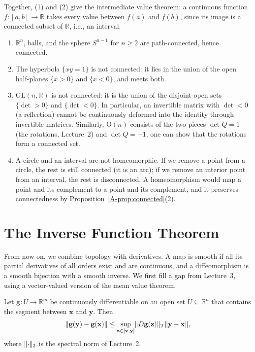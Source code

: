 Together, (1) and (2) give the intermediate value theorem: a continuous function $f: [a, b] \to \mathbb{R}$ takes every value between $f(a)$ and $f(b)$, since its image is a connected subset of $\mathbb{R}$, i.e., an interval.

\begin{example}\label{A-ex:connected}
    \begin{enumerate}
        \item $\mathbb{R}^n$, balls, and the sphere $S^{n-1}$ for $n \geq 2$ are path-connected, hence connected.
        \item The hyperbola $\{xy = 1\}$ is not connected: it lies in the union of the open half-planes $\{x > 0\}$ and $\{x < 0\}$, and meets both.
        \item $\mathrm{GL}(n, \mathbb{R})$ is not connected: it is the union of the disjoint open sets $\{\det > 0\}$ and $\{\det < 0\}$. In particular, an invertible matrix with $\det < 0$ (a reflection) cannot be continuously deformed into the identity through invertible matrices. Similarly, $\mathrm{O}(n)$ consists of the two pieces $\det Q = 1$ (the rotations, Lecture~2) and $\det Q = -1$; one can show that the rotations form a connected set.
        \item A circle and an interval are not homeomorphic. If we remove a point from a circle, the rest is still connected (it is an arc); if we remove an interior point from an interval, the rest is disconnected. A homeomorphism would map a point and its complement to a point and its complement, and it preserves connectedness by Proposition~\ref{A-prop:connected}(2).
    \end{enumerate}
\end{example}

\section{The Inverse Function Theorem}\label{A-sec:inverse}

From now on, we combine topology with derivatives. A map is smooth if all its partial derivatives of all orders exist and are continuous, and a diffeomorphism is a smooth bijection with a smooth inverse. We first fill a gap from Lecture~3, using a vector-valued version of the mean value theorem.

\begin{lemma}\label{A-lem:mean-value}
    Let $\mathbf{g}: U \to \mathbb{R}^m$ be continuously differentiable on an open set $U \subseteq \mathbb{R}^n$ that contains the segment between $\mathbf{x}$ and $\mathbf{y}$. Then
    \[\lVert \mathbf{g}(\mathbf{y}) - \mathbf{g}(\mathbf{x}) \rVert \leq \sup_{\mathbf{z} \in [\mathbf{x}, \mathbf{y}]} \lVert D\mathbf{g}(\mathbf{z}) \rVert_2 \, \lVert \mathbf{y} - \mathbf{x} \rVert,\]
    where $\lVert \cdot \rVert_2$ is the spectral norm of Lecture~2.
\end{lemma}

